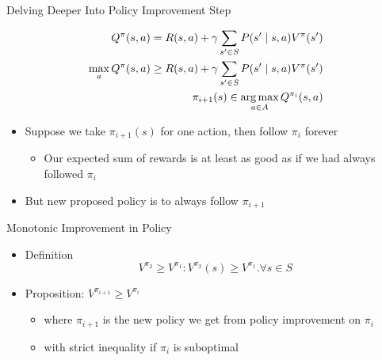 \begin{frame}[c]{Delving Deeper Into Policy Improvement Step}

\begin{eqnarray}
Q^\pi(s,a) = R(s,a) + \gamma \sum_{s' \in S} P(s' \mid s,a) V^\pi(s')\nonumber\\
\max_a Q^\pi(s,a) \geq R(s,a) + \gamma \sum_{s' \in S} P(s' \mid s,a) V^\pi(s') \nonumber\\
\pi_{i+1}(s) \in \operatorname*{arg\,max}_{a\in A} Q^{\pi_i} (s,a)\nonumber
\end{eqnarray}

\begin{itemize}
	\item Suppose we take $\pi_{i+1}(s)$ for one action, then follow $\pi_i$ forever
	\begin{itemize}
		\item Our expected sum of rewards is at least as good as if we had always
		followed $\pi_i$
	\end{itemize}
	\item But new proposed policy is to always follow $\pi_{i+1}$
\end{itemize}

\end{frame}
\begin{frame}[c]{Monotonic Improvement in Policy}

\begin{itemize}
	\item  Definition
	$$ V^{\pi_2} \geq V^{\pi_1}: V^{\pi_2}(s) \geq V^{\pi_1}. \forall s \in S $$
	\item Proposition: $V^{\pi_{i+1}} \geq V^{\pi_{i}}$
	\begin{itemize}
		\item where $\pi_{i+1}$ is the new policy we get from policy improvement on $\pi_i$
		\item with strict inequality if $\pi_i$ is suboptimal
	\end{itemize} 
\end{itemize}

\end{frame}
